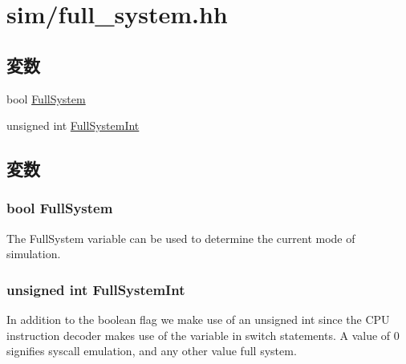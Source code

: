 \hypertarget{full__system_8hh}{
\section{sim/full\_\-system.hh}
\label{full__system_8hh}
}
\subsection*{変数}
\begin{DoxyCompactItemize}
\item 
bool \hyperlink{full__system_8hh_af929576af6f85c8849704b66d04b8370}{FullSystem}
\item 
unsigned int \hyperlink{full__system_8hh_af81c74238903f748aeed99a0b105fd0c}{FullSystemInt}
\end{DoxyCompactItemize}


\subsection{変数}
\hypertarget{full__system_8hh_af929576af6f85c8849704b66d04b8370}{
\subsubsection[{FullSystem}]{\setlength{\rightskip}{0pt plus 5cm}bool {\bf FullSystem}}}
\label{full__system_8hh_af929576af6f85c8849704b66d04b8370}
The FullSystem variable can be used to determine the current mode of simulation. \hypertarget{full__system_8hh_af81c74238903f748aeed99a0b105fd0c}{
\subsubsection[{FullSystemInt}]{\setlength{\rightskip}{0pt plus 5cm}unsigned int {\bf FullSystemInt}}}
\label{full__system_8hh_af81c74238903f748aeed99a0b105fd0c}
In addition to the boolean flag we make use of an unsigned int since the CPU instruction decoder makes use of the variable in switch statements. A value of 0 signifies syscall emulation, and any other value full system. 